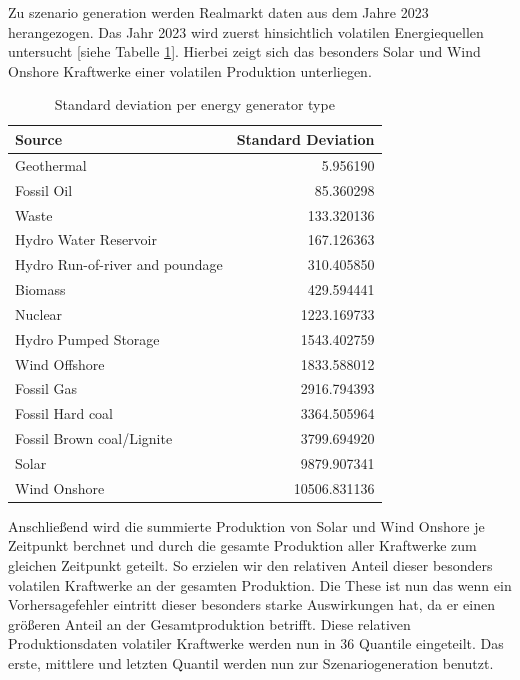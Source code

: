 Zu szenario generation werden Realmarkt daten aus dem Jahre 2023 herangezogen.
Das Jahr 2023 wird zuerst hinsichtlich volatilen Energiequellen untersucht [siehe Tabelle \ref{tab:energy_sources_std}].
Hierbei zeigt sich das besonders Solar und Wind Onshore Kraftwerke einer volatilen Produktion unterliegen.

\begin{table}[ht]
	\centering
	\begin{tabular}{|l|r|}
		\hline
		\textbf{Source}                 & \textbf{Standard Deviation} \\
		\hline
		Geothermal                      & 5.956190                    \\
		Fossil Oil                      & 85.360298                   \\
		Waste                           & 133.320136                  \\
		Hydro Water Reservoir           & 167.126363                  \\
		Hydro Run-of-river and poundage & 310.405850                  \\
		Biomass                         & 429.594441                  \\
		Nuclear                         & 1223.169733                 \\
		Hydro Pumped Storage            & 1543.402759                 \\
		Wind Offshore                   & 1833.588012                 \\
		Fossil Gas                      & 2916.794393                 \\
		Fossil Hard coal                & 3364.505964                 \\
		Fossil Brown coal/Lignite       & 3799.694920                 \\
		Solar                           & 9879.907341                 \\
		Wind Onshore                    & 10506.831136                \\
		\hline
	\end{tabular}
	\caption{Standard deviation per energy generator type}
	\label{tab:energy_sources_std}
\end{table}

Anschließend wird die summierte Produktion von Solar und Wind Onshore je Zeitpunkt berchnet und
durch die gesamte Produktion aller Kraftwerke zum gleichen Zeitpunkt geteilt. So erzielen wir den relativen
Anteil dieser besonders volatilen Kraftwerke an der gesamten Produktion. Die These ist nun das wenn ein Vorhersagefehler eintritt
dieser besonders starke Auswirkungen hat, da er einen größeren Anteil an der Gesamtproduktion betrifft.
Diese relativen Produktionsdaten volatiler Kraftwerke werden nun in 36 Quantile eingeteilt. Das erste, mittlere und letzten
Quantil werden nun zur Szenariogeneration benutzt.

